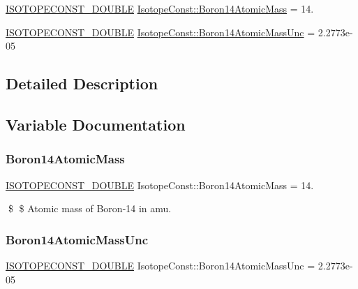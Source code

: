 \begin{DoxyCompactItemize}
\item 
\mbox{\hyperlink{group___isotope_const-_macros_ga8f45a7272ce02c0b4c65c44636ed719a}{I\+S\+O\+T\+O\+P\+E\+C\+O\+N\+S\+T\+\_\+\+D\+O\+U\+B\+LE}} \mbox{\hyperlink{group___isotope_const-_boron-_b14_ga3ac363df61dbf25268c5d922d83c6149}{Isotope\+Const\+::\+Boron14\+Atomic\+Mass}} = 14.
\item 
\mbox{\hyperlink{group___isotope_const-_macros_ga8f45a7272ce02c0b4c65c44636ed719a}{I\+S\+O\+T\+O\+P\+E\+C\+O\+N\+S\+T\+\_\+\+D\+O\+U\+B\+LE}} \mbox{\hyperlink{group___isotope_const-_boron-_b14_ga6e1f4aee182cf16307603858ba4cbc52}{Isotope\+Const\+::\+Boron14\+Atomic\+Mass\+Unc}} = 2.\+2773e-\/05
\end{DoxyCompactItemize}


\subsection{Detailed Description}


\subsection{Variable Documentation}
\mbox{\label{group___isotope_const-_boron-_b14_ga3ac363df61dbf25268c5d922d83c6149}} 
\subsubsection{\texorpdfstring{Boron14\+Atomic\+Mass}{Boron14AtomicMass}}
{\footnotesize\ttfamily \mbox{\hyperlink{group___isotope_const-_macros_ga8f45a7272ce02c0b4c65c44636ed719a}{I\+S\+O\+T\+O\+P\+E\+C\+O\+N\+S\+T\+\_\+\+D\+O\+U\+B\+LE}} Isotope\+Const\+::\+Boron14\+Atomic\+Mass = 14.}

\$ \$ Atomic mass of Boron-\/14 in amu. \mbox{\label{group___isotope_const-_boron-_b14_ga6e1f4aee182cf16307603858ba4cbc52}} 
\subsubsection{\texorpdfstring{Boron14\+Atomic\+Mass\+Unc}{Boron14AtomicMassUnc}}
{\footnotesize\ttfamily \mbox{\hyperlink{group___isotope_const-_macros_ga8f45a7272ce02c0b4c65c44636ed719a}{I\+S\+O\+T\+O\+P\+E\+C\+O\+N\+S\+T\+\_\+\+D\+O\+U\+B\+LE}} Isotope\+Const\+::\+Boron14\+Atomic\+Mass\+Unc = 2.\+2773e-\/05}

